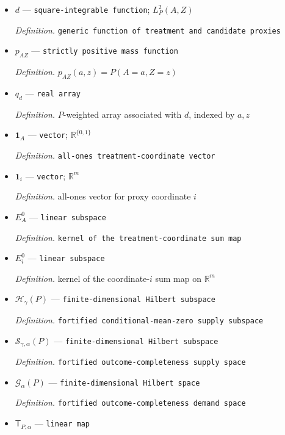\documentclass{article}
\begin{document}
\begin{itemize}
  \item \(d\) --- \texttt{square-\allowbreak{}integrable function}; \(L_P^2(A,Z)\)
  \par\smallskip\noindent\emph{Definition.} \texttt{generic function of treatment and candidate proxies}
  \item \(p_{AZ}\) --- \texttt{strictly positive mass function}
  \par\smallskip\noindent\emph{Definition.} \(p_{AZ}(a,z)=P(A=a,Z=z)\)
  \item \(q_d\) --- \texttt{real array}
  \par\smallskip\noindent\emph{Definition.} \(P\)-weighted array associated with \(d\), indexed by \(a,z\)
  \item \(\mathbf 1_A\) --- \texttt{vector}; \(\mathbb R^{\{0,1\}}\)
  \par\smallskip\noindent\emph{Definition.} \texttt{all-\allowbreak{}ones treatment-\allowbreak{}coordinate vector}
  \item \(\mathbf 1_i\) --- \texttt{vector}; \(\mathbb R^m\)
  \par\smallskip\noindent\emph{Definition.} all-ones vector for proxy coordinate \(i\)
  \item \(E_A^0\) --- \texttt{linear subspace}
  \par\smallskip\noindent\emph{Definition.} \texttt{kernel of the treatment-\allowbreak{}coordinate sum map}
  \item \(E_i^0\) --- \texttt{linear subspace}
  \par\smallskip\noindent\emph{Definition.} kernel of the coordinate-\(i\) sum map on \(\mathbb R^m\)
  \item \(\mathcal H_\gamma(P)\) --- \texttt{finite-\allowbreak{}dimensional Hilbert subspace}
  \par\smallskip\noindent\emph{Definition.} \texttt{fortified conditional-\allowbreak{}mean-\allowbreak{}zero supply subspace}
  \item \(\mathcal S_{\gamma,\alpha}(P)\) --- \texttt{finite-\allowbreak{}dimensional Hilbert subspace}
  \par\smallskip\noindent\emph{Definition.} \texttt{fortified outcome-\allowbreak{}completeness supply space}
  \item \(\mathcal G_\alpha(P)\) --- \texttt{finite-\allowbreak{}dimensional Hilbert space}
  \par\smallskip\noindent\emph{Definition.} \texttt{fortified outcome-\allowbreak{}completeness demand space}
  \item \(\mathsf T_{P,\alpha}\) --- \texttt{linear map}

\end{itemize}
\end{document}
